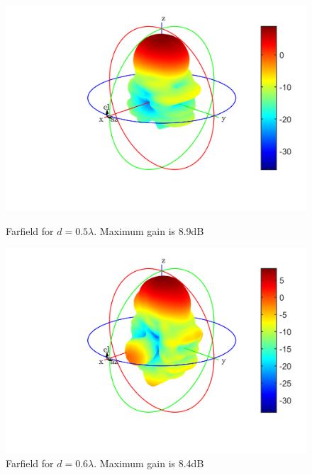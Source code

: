 \begin{figure}[H]
  \centering
  \begin{minipage}[b]{0.5\textwidth}
	\includegraphics[scale = 0.5]{figures/measurement/antennas/array_2_0p5.png}
	\caption{Farfield for $d = 0.5\lambda$. Maximum gain is 8.9dB}
    \label{fig:chamber_two_ant_ff_05}
  \end{minipage}
  \hfill
  \begin{minipage}[b]{0.4\textwidth}
\includegraphics[scale = 0.5]{figures/measurement/antennas/array_2_0p6.png}
\caption{Farfield for $d = 0.6\lambda$. Maximum gain is 8.4dB}
    \label{fig:chamber_two_ant_ff:06}
  \end{minipage}
\end{figure}


